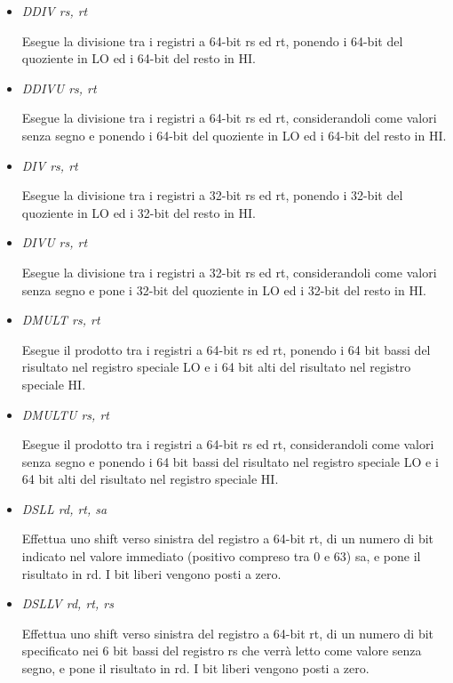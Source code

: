 \documentclass[letterpaper,10pt,english]{sphinxmanual}
\begin{document}
\begin{itemize}
\item {} 
\emph{DDIV rs, rt}

Esegue la divisione tra i registri a 64-bit rs ed rt, ponendo i 64-bit del
quoziente in LO ed i 64-bit del resto in HI.

\item {} 
\emph{DDIVU rs, rt}

Esegue la divisione tra i registri a 64-bit rs ed rt, considerandoli come
valori senza segno e ponendo i 64-bit del quoziente in LO ed i 64-bit del
resto in HI.

\item {} 
\emph{DIV rs, rt}

Esegue la divisione tra i registri a 32-bit rs ed rt, ponendo i 32-bit del
quoziente in LO ed i 32-bit del resto in HI.

\item {} 
\emph{DIVU rs, rt}

Esegue la divisione tra i registri a 32-bit rs ed rt, considerandoli come
valori senza segno e pone i 32-bit del quoziente in LO ed i 32-bit del resto
in HI.

\item {} 
\emph{DMULT rs, rt}

Esegue il prodotto tra i registri a 64-bit rs ed rt, ponendo i 64 bit bassi
del risultato nel registro speciale LO e i 64 bit alti del risultato nel
registro speciale HI.

\item {} 
\emph{DMULTU rs, rt}

Esegue il prodotto tra i registri a 64-bit rs ed rt, considerandoli come
valori senza segno e ponendo i 64 bit bassi del risultato nel registro
speciale LO e i 64 bit alti del risultato nel registro speciale HI.

\item {} 
\emph{DSLL rd, rt, sa}

Effettua uno shift verso sinistra del registro a 64-bit rt, di un numero di
bit indicato nel valore immediato (positivo compreso tra 0 e 63) sa, e pone
il risultato in rd. I bit liberi vengono posti a zero.

\item {} 
\emph{DSLLV rd, rt, rs}

Effettua uno shift verso sinistra del registro a 64-bit rt, di un numero di
bit specificato nei 6 bit bassi del registro rs che verrà letto come valore
senza segno, e pone il risultato in rd. I bit liberi vengono posti a zero.


\end{itemize}
\end{document}
